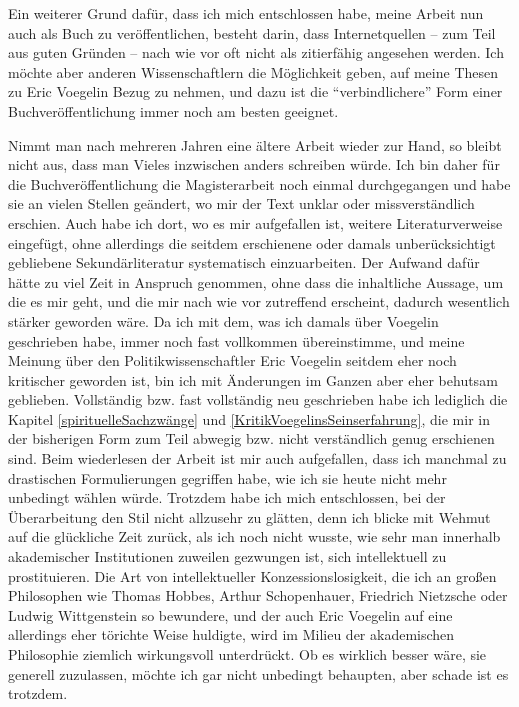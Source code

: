 Ein weiterer Grund dafür, dass ich mich entschlossen habe, meine Arbeit nun
auch als Buch zu veröffentlichen, besteht darin, dass Internetquellen -- zum
Teil aus guten Gründen -- nach wie vor oft nicht als zitierfähig angesehen
werden. Ich möchte aber anderen Wissenschaftlern die Möglichkeit geben, auf
meine Thesen zu Eric Voegelin Bezug zu nehmen, und dazu ist die
``verbindlichere'' Form einer Buchveröffentlichung immer noch am besten
geeignet.

Nimmt man nach mehreren Jahren eine ältere Arbeit wieder zur Hand, so bleibt
nicht aus, dass man Vieles inzwischen anders schreiben würde. Ich bin daher
für die Buchveröffentlichung die Magisterarbeit noch einmal durchgegangen und
habe sie an vielen Stellen geändert, wo mir der Text unklar oder
missverständlich erschien. Auch habe ich dort, wo es mir aufgefallen ist,
weitere Literaturverweise eingefügt, ohne allerdings die seitdem erschienene
oder damals unberücksichtigt gebliebene Sekundärliteratur systematisch
einzuarbeiten. Der Aufwand dafür hätte zu viel Zeit in Anspruch genommen, ohne
dass die inhaltliche Aussage, um die es mir geht, und die mir nach wie vor
zutreffend erscheint, dadurch wesentlich stärker geworden wäre. Da ich mit
dem, was ich damals über Voegelin geschrieben habe, immer noch fast vollkommen
übereinstimme, und meine Meinung über den Politikwissenschaftler Eric Voegelin
seitdem eher noch kritischer geworden ist, bin ich mit Änderungen im Ganzen
aber eher behutsam geblieben. Vollständig bzw. fast vollständig neu
geschrieben habe ich lediglich die Kapitel \ref{spirituelleSachzwänge} und
\ref{KritikVoegelinsSeinserfahrung}, die mir in der bisherigen Form zum Teil
abwegig bzw. nicht verständlich genug erschienen sind. Beim wiederlesen der
Arbeit ist mir auch aufgefallen, dass ich manchmal zu drastischen
Formulierungen gegriffen habe, wie ich sie heute nicht mehr unbedingt wählen
würde. Trotzdem habe ich mich entschlossen, bei der Überarbeitung den Stil
nicht allzusehr zu glätten, denn ich blicke mit Wehmut auf die glückliche Zeit
zurück, als ich noch nicht wusste, wie sehr man innerhalb akademischer
Institutionen zuweilen gezwungen ist, sich intellektuell zu prostituieren. Die
Art von intellektueller Konzessionslosigkeit, die ich an großen Philosophen
wie Thomas Hobbes, Arthur Schopenhauer, Friedrich Nietzsche oder Ludwig
Wittgenstein so bewundere, und der auch Eric Voegelin auf eine allerdings eher
törichte Weise huldigte, wird im Milieu der akademischen Philosophie ziemlich
wirkungsvoll unterdrückt. Ob es wirklich besser wäre, sie generell zuzulassen,
möchte ich gar nicht unbedingt behaupten, aber schade ist es trotzdem.


